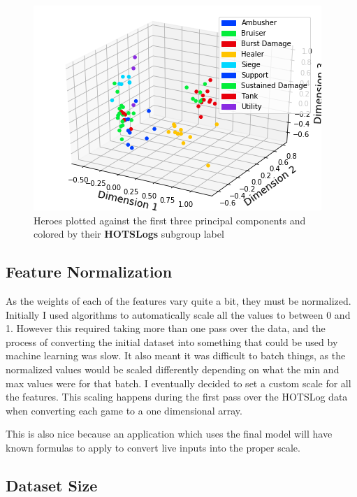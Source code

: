 \documentclass[twoside,twocolumn]{article}
\begin{document}
\begin{figure}
\caption{Heroes plotted against the first three principal components and colored by their \textbf{HOTSLogs} subgroup label}
\label{figure:heropca}
\centering
\includegraphics[width=\linewidth]{heropca}
\end{figure}

\subsection{Feature Normalization}

As the weights of each of the features vary quite a bit, they must be normalized.  Initially I used algorithms to automatically scale all the values to between 0 and 1.  However this required taking more than one pass over the data, and the process of converting the initial dataset into something that could be used by machine learning was slow.  It also meant it was difficult to batch things, as the normalized values would be scaled differently depending on what the min and max values were for that batch.  I eventually decided to set a custom scale for all the features.  This scaling happens during the first pass over the HOTSLog data when converting each game to a one dimensional array.

This is also nice because an application which uses the final model will have known formulas to apply to convert live inputs into the proper scale.

\subsection{Dataset Size}
\end{document}
